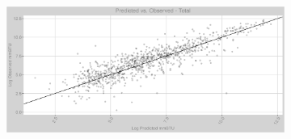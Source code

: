 \FloatBarrier
\newpage
\begin{figure}
\begin{subfigure}{1\textwidth}
\centering
\includegraphics[width=.99\textheight, height=0.99\textwidth, angle=90, origin=c]{Images/natural_gas_psf_nn_full_pvo_transformed.png}
\end{subfigure}
\end{figure}
\FloatBarrier
\newpage
